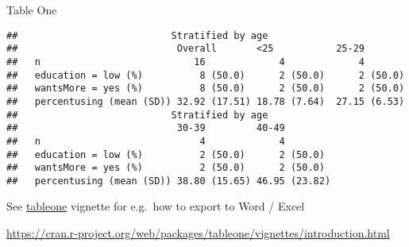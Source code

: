 \documentclass[
  ignorenonframetext,
]{beamer}
\begin{document}
\begin{frame}[fragile]{Table One}
\protect\hypertarget{table-one}{}

\tiny

\begin{verbatim}
##                           Stratified by age
##                            Overall       <25           25-29        
##   n                           16             4             4        
##   education = low (%)          8 (50.0)      2 (50.0)      2 (50.0) 
##   wantsMore = yes (%)          8 (50.0)      2 (50.0)      2 (50.0) 
##   percentusing (mean (SD)) 32.92 (17.51) 18.78 (7.64)  27.15 (6.53) 
##                           Stratified by age
##                            30-39         40-49        
##   n                            4             4        
##   education = low (%)          2 (50.0)      2 (50.0) 
##   wantsMore = yes (%)          2 (50.0)      2 (50.0) 
##   percentusing (mean (SD)) 38.80 (15.65) 46.95 (23.82)
\end{verbatim}

\footnotesize

See
\href{https://cran.r-project.org/web/packages/tableone/vignettes/introduction.html}{tableone}
vignette for e.g.~how to export to Word / Excel

\url{https://cran.r-project.org/web/packages/tableone/vignettes/introduction.html}

\end{frame}
\end{document}
